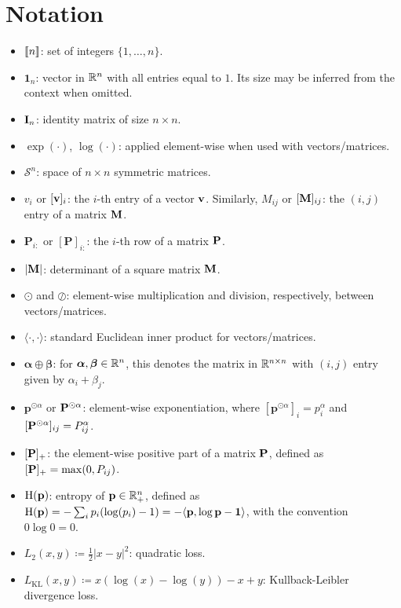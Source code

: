 \section*{Notation}

\begin{itemize}
    \item ${[\![n]\!]}$: set of integers $\{1,\dots,n\}$.
    \item $\mathbf{1}_n$: vector in $\mathbb{R}^n$ with all entries equal to $1$. Its size may be inferred from the context when omitted.
    \item ${\mathbf{I}}_n$: identity matrix of size $n \times n$.
    \item $\exp(\cdot)$, $\log(\cdot)$: applied element-wise when used with vectors/matrices.
    \item $\mathcal{S}^n$: space of $n \times n$ symmetric matrices.
    \item $v_i$ or $[{\mathbf{v}}]_i$: the $i$-th entry of a vector ${\mathbf{v}}$. Similarly, $M_{ij}$ or $[{\mathbf{M}}]_{ij}$: the $(i,j)$ entry of a matrix ${\mathbf{M}}$.
    \item $\mathbf{P}_{i:}$ or $[\mathbf{P}]_{i:}$: the $i$-th row of a matrix $\mathbf{P}$.
    \item $|{\mathbf{M}}|$: determinant of a square matrix ${\mathbf{M}}$.
    \item $\odot$ and $\oslash$: element-wise multiplication and division, respectively, between vectors/matrices.
    \item $\langle \cdot, \cdot \rangle$: standard Euclidean inner product for vectors/matrices.
    \item $\bm{\alpha} \oplus \bm{\beta}$: for $\bm{\alpha}, \bm{\beta} \in \mathbb{R}^n$, this denotes the matrix in $\mathbb{R}^{n \times n}$ with $(i,j)$ entry given by $\alpha_i + \beta_j$.
    \item $\bm{p}^{\odot \alpha}$ or ${\mathbf{P}}^{\odot \alpha}$: element-wise exponentiation, where $[\bm{p}^{\odot \alpha}]_i = p_i^\alpha$ and $[{\mathbf{P}}^{\odot \alpha}]_{ij} = P_{ij}^\alpha$.
    \item $[{\mathbf{P}}]_+$: the element-wise positive part of a matrix ${\mathbf{P}}$, defined as $[{\mathbf{P}}]_+ = \max(0, P_{ij})$.
    \item $\operatorname{H}(\mathbf{p})$: entropy of $\mathbf{p} \in \mathbb{R}^{n}_+$, defined as $\operatorname{H}(\mathbf{p}) = -\sum_{i} p_i (\log(p_i) - 1) = -\langle \mathbf{p}, \log \mathbf{p} - \bm{1} \rangle$, with the convention $0 \log 0 = 0$.
    \item $L_2(x,y) \coloneqq \frac{1}{2} |x - y|^2$: quadratic loss.
    \item $L_{\mathrm{KL}}(x,y) \coloneqq x (\log(x) - \log(y)) - x + y$: Kullback-Leibler divergence loss.

\end{itemize}
